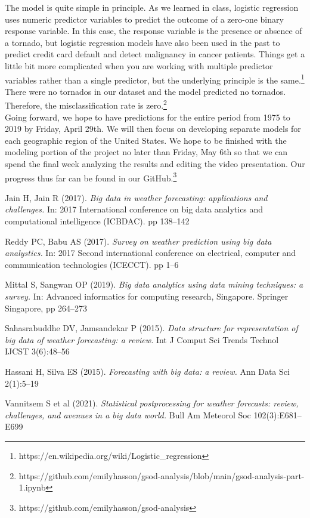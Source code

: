 \documentclass[conference]{IEEEtran}
\begin{document}
The model is quite simple in principle. As we learned in class, logistic regression uses numeric predictor variables to predict the outcome of a zero-one binary response variable. In this case, the response variable is the presence or absence of a tornado, but logistic regression  models have also been used in the past to predict credit card default and detect malignancy in cancer patients. Things get a little bit more complicated when you are working with multiple predictor variables rather than a single predictor, but the underlying principle is the same.\footnote{https://en.wikipedia.org/wiki/Logistic\_regression} \\

There were no tornados in our dataset and the model predicted no tornados. Therefore, the misclassification rate is zero.\footnote{https://github.com/emilyhasson/gsod-analysis/blob/main/gsod-analysis-part-1.ipynb} \\

Going forward, we hope to have predictions for the entire period from 1975 to 2019 by Friday, April 29th. We will then focus on developing separate models for each geographic region of the United States. We hope to be finished with the modeling portion of the project no later than Friday, May 6th so that we can spend the final week analyzing the results and editing the video presentation. Our progress thus far can be found in our GitHub.\footnote{https://github.com/emilyhasson/gsod-analysis}\\

\begin{thebibliography}{9}

Jain H, Jain R (2017). \textit{Big data in weather forecasting: applications and challenges.} In: 2017 International conference on big data analytics and computational intelligence (ICBDAC). pp 138–142

Reddy PC, Babu AS (2017). \textit{Survey on weather prediction using big data analystics.} In: 2017 Second international conference on electrical, computer and communication technologies (ICECCT). pp 1–6

Mittal S, Sangwan OP (2019). \textit{Big data analytics using data mining techniques: a survey.} In: Advanced informatics for computing research, Singapore. Springer Singapore, pp 264–273

Sahasrabuddhe DV, Jamsandekar P (2015). \textit{Data structure for representation of big data of weather forecasting: a review.} Int J Comput Sci Trends Technol IJCST 3(6):48–56

Hassani H, Silva ES (2015). \textit{Forecasting with big data: a review.} Ann Data Sci 2(1):5–19

Vannitsem S et al (2021). \textit{Statistical postprocessing for weather forecasts: review, challenges, and avenues in a big data world.} Bull Am Meteorol Soc 102(3):E681–E699

\end{thebibliography}
\end{document}
